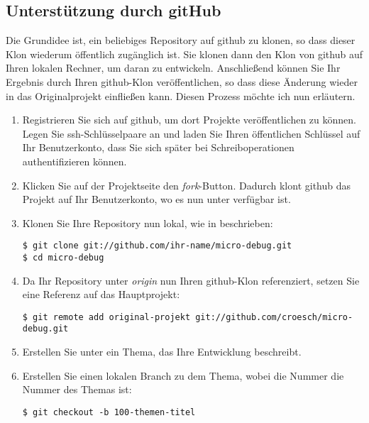 \subsection{Unterstützung durch gitHub}
Die Grundidee ist, ein beliebiges Repository auf github zu klonen, so dass dieser Klon wiederum öffentlich zugänglich ist. Sie klonen dann den Klon von github auf Ihren lokalen Rechner, um daran zu entwickeln. Anschließend können Sie Ihr Ergebnis durch Ihren github-Klon veröffentlichen, so dass diese Änderung wieder in das Originalprojekt einfließen kann. Diesen Prozess möchte ich nun erläutern.

\begin{enumerate}
\item Registrieren Sie sich auf github, um dort Projekte veröffentlichen zu können. Legen Sie ssh-Schlüsselpaare an und laden Sie Ihren öffentlichen Schlüssel auf Ihr Benutzerkonto, dass Sie sich später bei Schreiboperationen authentifizieren können.

\item Klicken Sie auf der Projektseite  den \emph{fork}-Button. Dadurch klont github das Projekt auf Ihr Benutzerkonto, wo es nun unter  verfügbar ist.

\item Klonen Sie Ihre Repository nun lokal, wie in  beschrieben:
\begin{verbatim}
$ git clone git://github.com/ihr-name/micro-debug.git
$ cd micro-debug
\end{verbatim}

\item Da Ihr Repository unter \emph{origin} nun Ihren github-Klon referenziert, setzen Sie eine Referenz auf das Hauptprojekt:
\begin{verbatim}
$ git remote add original-projekt git://github.com/croesch/micro-debug.git
\end{verbatim}

\item Erstellen Sie unter  ein Thema, das Ihre Entwicklung beschreibt.

\item Erstellen Sie einen lokalen Branch zu dem Thema, wobei die Nummer die Nummer des Themas ist:
\begin{verbatim}
$ git checkout -b 100-themen-titel
\end{verbatim}


\end{enumerate}

